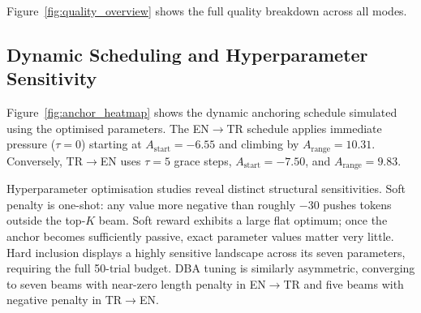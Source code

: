 \documentclass{tlp}
\begin{document}
Figure~\ref{fig:quality_overview} shows the full quality breakdown across all modes.

\subsection{Dynamic Scheduling and Hyperparameter Sensitivity}

Figure~\ref{fig:anchor_heatmap} shows the dynamic anchoring schedule simulated using
the optimised parameters. The EN$\rightarrow$TR schedule applies immediate pressure
($\tau = 0$) starting at $A_{\text{start}} = -6.55$ and climbing by
$A_{\text{range}} = 10.31$. Conversely, TR$\rightarrow$EN uses $\tau = 5$ grace
steps, $A_{\text{start}} = -7.50$, and $A_{\text{range}} = 9.83$.

Hyperparameter optimisation studies reveal distinct structural sensitivities. Soft
penalty is one-shot: any value more negative than roughly $-30$ pushes tokens outside
the top-$K$ beam. Soft reward exhibits a large flat optimum; once the anchor becomes
sufficiently passive, exact parameter values matter very little. Hard inclusion
displays a highly sensitive landscape across its seven parameters, requiring the full
50-trial budget. DBA tuning is similarly asymmetric, converging to seven beams with
near-zero length penalty in EN$\rightarrow$TR and five beams with negative penalty
in TR$\rightarrow$EN.
\end{document}
